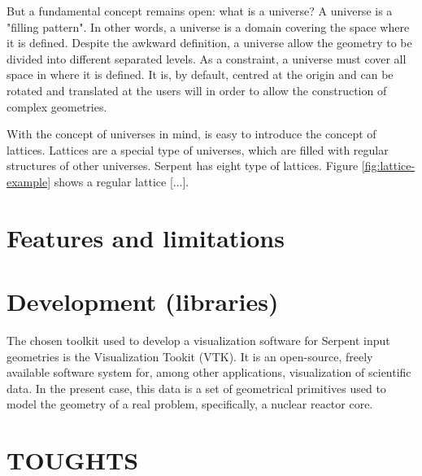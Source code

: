 \documentclass{elsarticle}
\begin{document}
But a fundamental concept remains open: what is a universe? A universe is a "filling pattern". In other words, a universe is a domain covering the space where it is defined. Despite the awkward definition, a universe allow the geometry to 
be divided into different separated levels. As a constraint, a universe must 
cover all space in where it is defined. It is, by default, centred at the 
origin and can be rotated and translated at the users will in order to allow 
the construction of complex geometries.

With the concept of universes in mind, is easy to introduce the concept of 
lattices. Lattices are a special type of universes, which are filled with 
regular structures of other universes. Serpent has eight type of lattices. 
Figure \ref{fig:lattice-example} shows a regular lattice [...].




\section{Features and limitations}

\section{Development (libraries)}

The chosen toolkit used to develop a visualization software for Serpent input 
geometries is the Visualization Tookit (VTK)\cite{vtk}. It is an open-source, 
freely available software system for, among other applications, visualization of 
scientific data. In the present case, this data is a set of geometrical 
primitives used to model the geometry of a real problem, specifically, a 
nuclear reactor core.

\section{TOUGHTS}
\end{document}

